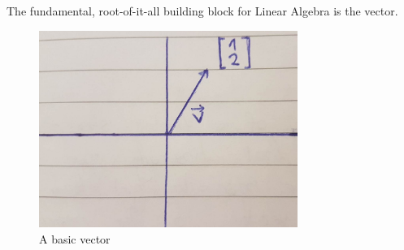 \documentclass{article}
\begin{document}
\maketitle

The fundamental, root-of-it-all building block for Linear Algebra is the vector.

\begin{figure}[h]
    \centering
    \includegraphics[width=0.75\textwidth]{Math/linear_algebra/images/la_1.png}
    \caption{A basic vector}
    \label{fig1}
\end{figure}
\end{document}
